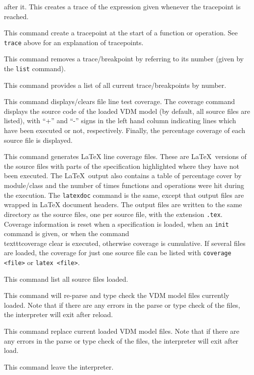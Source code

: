 \documentclass{overturerep}
\begin{document}
{\begin{description}
  after it. This creates a trace of the expression given
  whenever the tracepoint is reached.  
\item[\texttt{trace <function/operation> [<exp>]}:] This command
  create a tracepoint at the start of a function or operation.
  See \texttt{trace} above for an explanation of tracepoints.
\item[\texttt{remove <breakpoint\#>}:] This command removes a
  trace/breakpoint by referring to its number (given by the
  \texttt{list} command).  
\item[\texttt{list}:] This command provides a list of all current
  trace/breakpoints by number.  
\item[\texttt{coverage [<file>|clear]}:] This command displays/clears
  file line test coverage. The coverage command displays the source
  code of the loaded VDM model (by default, all source files are
  listed), with ``+'' and ``-'' signs in the left hand column indicating
  lines which have been executed or not, respectively. Finally, the
  percentage coverage of each source file is
  displayed.  
\item[\texttt{latex|latexdoc [<files>]}:] This command generates LaTeX
  line coverage files. These are \LaTeX\ versions of the source files
  with parts of the
  specification highlighted where they have not been executed. The
  \LaTeX\ output also contains a table of percentage cover by
  module/class and the number of times functions and operations were
  hit during the execution. The \texttt{latexdoc} command is the same,
  except that output files are wrapped in LaTeX document headers. The
  output files are written to the same directory as the source files, one
  per source file, with the extension \texttt{.tex}. Coverage
  information is reset when a specification is loaded, when an \texttt{init}
  command is given, or when the
  command \\texttt{coverage clear} is executed, otherwise coverage is
  cumulative. If several files are loaded, the coverage for just one
  source file can be listed with \texttt{coverage <file>} or
  \texttt{latex <file>}.  
\item[\texttt{files}:] This command list all source files loaded.
\item[\texttt{reload}:] This command will re-parse and type check the
  VDM model files currently loaded. Note that if there are any errors
  in the parse or type check of the files, the interpreter will exit
  after reload. 
\item[\texttt{load <files>}:] This command replace current loaded VDM
  model files. Note that if there are any errors in the parse or type
  check of the files, the interpreter will exit after
  load.  
\item[\texttt{[q]uit}:] This command leave the
  interpreter.  
\end{description}

}
\end{document}
